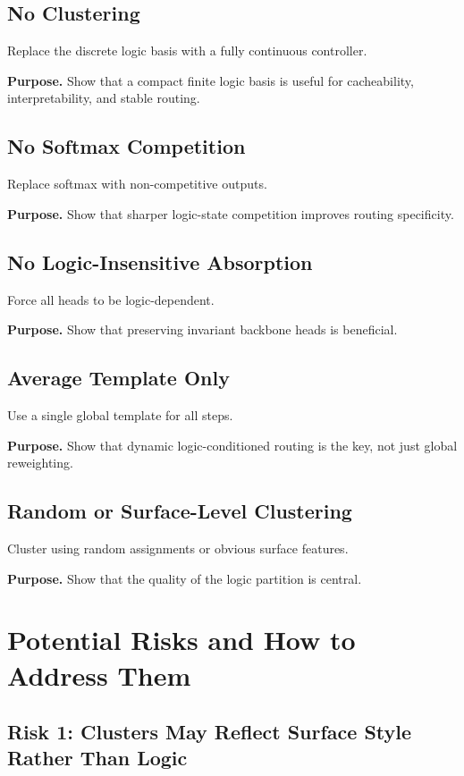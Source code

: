 \documentclass[11pt]{article}
\begin{document}
\subsection{No Clustering}

Replace the discrete logic basis with a fully continuous controller.

\textbf{Purpose.} Show that a compact finite logic basis is useful for cacheability, interpretability, and stable routing.

\subsection{No Softmax Competition}

Replace softmax with non-competitive outputs.

\textbf{Purpose.} Show that sharper logic-state competition improves routing specificity.

\subsection{No Logic-Insensitive Absorption}

Force all heads to be logic-dependent.

\textbf{Purpose.} Show that preserving invariant backbone heads is beneficial.

\subsection{Average Template Only}

Use a single global template for all steps.

\textbf{Purpose.} Show that dynamic logic-conditioned routing is the key, not just global reweighting.

\subsection{Random or Surface-Level Clustering}

Cluster using random assignments or obvious surface features.

\textbf{Purpose.} Show that the quality of the logic partition is central.

\section{Potential Risks and How to Address Them}

\subsection{Risk 1: Clusters May Reflect Surface Style Rather Than Logic}
\end{document}
